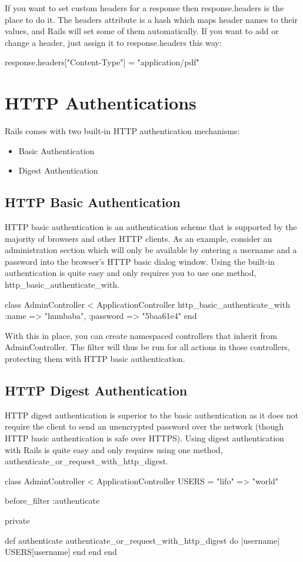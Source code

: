\documentclass[10pt]{book}
\newenvironment{code}{%
  \scriptsize
    \verbatim
}{%
    \endverbatim
    \newline
}
\begin{document}
If you want to set custom headers for a response then response.headers  is the place to do it. The headers attribute is a hash which maps  header names to their values, and Rails will set some of them  automatically. If you want to add or change a header, just assign it to response.headers this way:
\begin{code}
response.headers["Content-Type"] = "application/pdf"
\end{code}

\section{ HTTP Authentications}

Rails comes with two built-in HTTP authentication mechanisms:
\begin{itemize}
	\item Basic Authentication
	\item Digest Authentication
\end{itemize}

\subsection{ HTTP Basic Authentication}

HTTP basic authentication is an authentication scheme that is supported by the majority of browsers and other HTTP  clients. As an example, consider an administration section which will  only be available by entering a username and a password into the  browser’s HTTP basic dialog window. Using the built-in authentication is quite easy and only requires you to use one method, \\ http\_basic\_authenticate\_with.
\begin{code}
class AdminController < ApplicationController
  http_basic_authenticate_with :name => "humbaba", :password => "5baa61e4"
end
\end{code}

With this in place, you can create namespaced controllers that inherit from AdminController. The filter will thus be run for all actions in those controllers, protecting them with HTTP basic authentication.

\subsection{ HTTP Digest Authentication}

HTTP digest authentication is superior to  the basic authentication as it does not require the client to send an  unencrypted password over the network (though HTTP basic authentication is safe over HTTPS). Using digest authentication with Rails is quite easy and only requires using one method, authenticate\_or\_request\_with\_http\_digest.
\begin{code}
class AdminController < ApplicationController
  USERS = { "lifo" => "world" }
 
  before_filter :authenticate
 
  private
 
  def authenticate
    authenticate_or_request_with_http_digest do |username|
      USERS[username]
    end
  end
end
\end{code}
\end{document}
